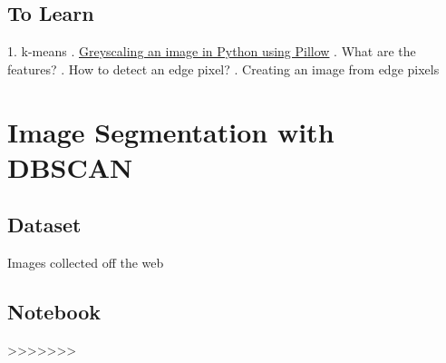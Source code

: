 \documentclass{article}
\begin{document}
\subsection*{To Learn}
1. k-means
. \href{https://stackoverflow.com/questions/12201577/how-can-i-convert-an-rgb-image-into-grayscale-in-python}{Greyscaling an image in Python using Pillow}
. What are the features?
. How to detect an edge pixel?
. Creating an image from edge pixels
\section*{Image Segmentation with DBSCAN}
\subsection*{Dataset}
Images collected off the web
\subsection*{Notebook}
>>>>>>> 
\end{document}
